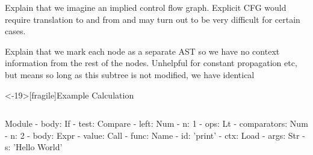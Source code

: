 Explain that we imagine an implied control flow graph. Explicit CFG would require translation to and from and may turn out to be very difficult for certain cases.

Explain that we mark each node as a separate AST so we have no context information from the rest of the nodes. Unhelpful for constant propagation etc, but means
so long as this subtree is not modified, we have identical 

\begin{frame}<-19>[fragile]{Example Calculation}
\begin{columns}[t]
{\small
\begin{semiverbatim}
\alert<2-18>{Module} {\tiny {}}
\alert<3-17>{  - body: If} {\tiny {}}
\alert<4-11>{    - test: Compare} {\tiny {}}
\alert<5-7>{      - left: Num} {\tiny \only<7->{nv, nb, \{\}, \{\}}}
\alert<6>{        - n: 1} {\tiny {}}
\alert<8>{      - ops: Lt} {\tiny {}}
\alert<9-10>{      - comparators: Num} {\tiny \only<10->{nv, nb, \{\}, \{\}}}
\alert<9>{        - n: 2} {\tiny {}}
\alert<12-16>{    - body: Expr} {\tiny {}}
\alert<12-15>{      - value: Call} {\tiny {}}
\alert<12>{        - func: Name} {\tiny {}}
\alert<12>{          - id: 'print'}
\alert<12>{          - ctx: Load}
\alert<13-14>{        - args: Str} {\tiny {}}
\alert<13>{          - s: 'Hello World'} {\tiny {}}
\end{semiverbatim}}
\end{columns}
\end{frame}
